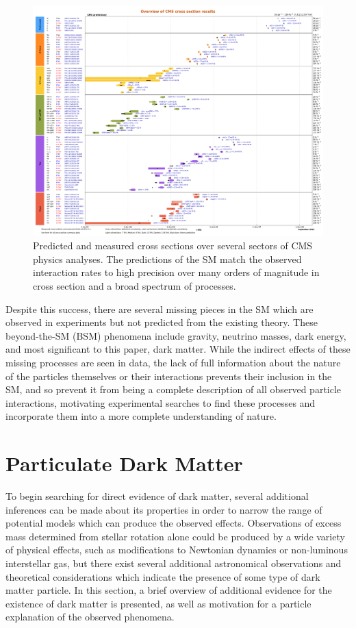 \begin{figure}[htpb]
	\includegraphics[width=1.1\textwidth]{figures/smRatePreds.pdf}
	\centering
	\caption[CMS Cross Section Results]{Predicted and measured cross sections over several sectors of CMS physics analyses. The predictions of the SM match the observed interaction rates to high precision over many orders of magnitude in cross section and a broad spectrum of processes.}
	\label{fig:SMratePreds}
\end{figure}

Despite this success, there are several missing pieces in the SM which are observed in experiments but not predicted from the existing theory.
These beyond-the-SM (BSM) phenomena include gravity, neutrino masses, dark energy, and most significant to this paper, dark matter.
While the indirect effects of these missing processes are seen in data, the lack of full information about the nature of the particles themselves or their interactions prevents their inclusion in the SM, and so prevent it from being a complete description of all observed particle interactions, motivating experimental searches to find these processes and incorporate them into a more complete understanding of nature.

\section{Particulate Dark Matter}
To begin searching for direct evidence of dark matter, several additional inferences can be made about its properties in order to narrow the range of potential models which can produce the observed effects.
Observations of excess mass determined from stellar rotation alone could be produced by a wide variety of physical effects, such as modifications to Newtonian dynamics or non-luminous interstellar gas, but there exist several additional astronomical observations and theoretical considerations which indicate the presence of some type of dark matter particle.
In this section, a brief overview of additional evidence for the existence of dark matter is presented, as well as motivation for a particle explanation of the observed phenomena.

